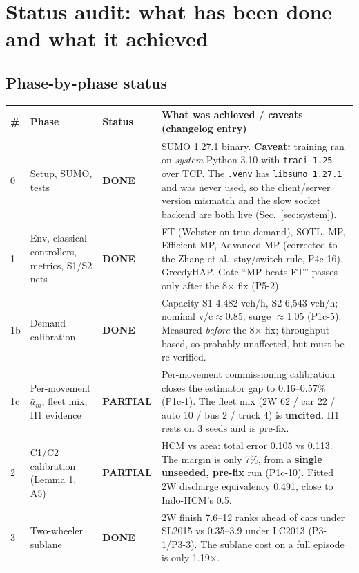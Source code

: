 \documentclass[11pt,a4paper]{article}
\newcommand{\done}{\textcolor{ok}{\textbf{DONE}}}
\newcommand{\partl}{\textcolor{warn}{\textbf{PARTIAL}}}
\begin{document}
\section{Status audit: what has been done and what it achieved}

\subsection{Phase-by-phase status}
\small
\begin{longtable}{@{}p{0.6cm}p{3.5cm}p{1.9cm}p{9.6cm}@{}}
\toprule
\# & Phase & Status & What was achieved / caveats (changelog entry) \\
\midrule
\endhead
0 & Setup, SUMO, tests & \done & SUMO 1.27.1 binary. \textbf{Caveat:} training ran on
  \emph{system} Python 3.10 with \texttt{traci 1.25} over TCP. The \texttt{.venv} has
  \texttt{libsumo 1.27.1} and was never used, so the client/server version mismatch and the
  slow socket backend are both live (Sec.~\ref{sec:system}). \\
1 & Env, classical controllers, metrics, S1/S2 nets & \done & FT (Webster on true demand),
  SOTL, MP, Efficient-MP, Advanced-MP (corrected to the Zhang et al.\ stay/switch rule,
  P4c-16), GreedyHAP. Gate ``MP beats FT'' passes only after the 8$\times$ fix (P5-2). \\
1b & Demand calibration & \done & Capacity S1 4{,}482 veh/h, S2 6{,}543 veh/h; nominal
  v/c$\approx$0.85, surge $\approx$1.05 (P1c-5). Measured \emph{before} the 8$\times$ fix;
  throughput-based, so probably unaffected, but must be re-verified. \\
1c & Per-movement $\bar a_m$, fleet mix, H1 evidence & \partl & Per-movement commissioning
  calibration closes the estimator gap to 0.16--0.57\% (P1c-1). The fleet mix
  (2W 62 / car 22 / auto 10 / bus 2 / truck 4) is \textbf{uncited}. H1 rests on 3 seeds and
  is pre-fix. \\
2 & C1/C2 calibration (Lemma 1, A5) & \partl & HCM vs area: total error 0.105 vs 0.113. The
  margin is only 7\%, from a \textbf{single unseeded, pre-fix} run (P1c-10). Fitted 2W
  discharge equivalency 0.491, close to Indo-HCM's 0.5. \\
3 & Two-wheeler sublane & \done & 2W finish 7.6--12 ranks ahead of cars under SL2015 vs
  0.35--3.9 under LC2013 (P3-1/P3-3). The sublane cost on a full episode is only
  1.19$\times$. \\

\end{longtable}
\end{document}
